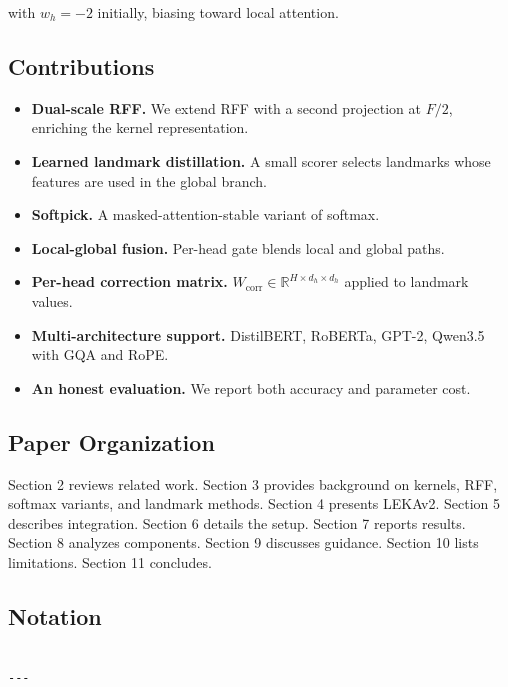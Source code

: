 with $w_h = -2$ initially, biasing toward local attention.

\subsection{Contributions}

\begin{itemize}
\item \textbf{Dual-scale RFF.} We extend RFF with a second projection at $F/2$,
  enriching the kernel representation.
\item \textbf{Learned landmark distillation.} A small scorer selects landmarks
  whose features are used in the global branch.
\item \textbf{Softpick.} A masked-attention-stable variant of softmax.
\item \textbf{Local-global fusion.} Per-head gate blends local and global paths.
\item \textbf{Per-head correction matrix.} $W_\text{corr} \in \mathbb{R}^{H \times d_h \times d_h}$
  applied to landmark values.
\item \textbf{Multi-architecture support.} DistilBERT, RoBERTa, GPT-2, Qwen3.5
  with GQA and RoPE.
\item \textbf{An honest evaluation.} We report both accuracy and parameter cost.

\end{itemize}
\subsection{Paper Organization}

Section 2 reviews related work. Section 3 provides background on kernels, 
RFF, softmax variants, and landmark methods. Section 4 presents LEKAv2. 
Section 5 describes integration. Section 6 details the setup. Section 7 
reports results. Section 8 analyzes components. Section 9 discusses 
guidance. Section 10 lists limitations. Section 11 concludes.



\subsection{Notation}

\begin{lstlisting}

---
\end{lstlisting}
